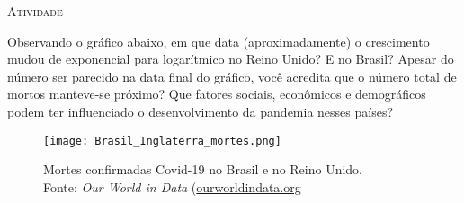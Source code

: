 \documentclass[10 pt,usenames,dvipsnames, oneside]{article}
\begin{document}
\bigskip
\begin{center}
{\large \scshape Atividade}
\end{center}
\fi

Observando o gráfico abaixo, em que data (aproximadamente) o crescimento mudou de exponencial para logarítmico no Reino Unido? E no Brasil? Apesar do número ser parecido na data final do gráfico, você acredita que o número total de mortos manteve-se próximo? Que fatores sociais, econômicos e demográficos podem ter influenciado o desenvolvimento da pandemia nesses países? 

\begin{figure}[H]
\centering
\texttt{[image: Brasil\_Inglaterra\_mortes.png]}

\caption{Mortes confirmadas Covid-19 no Brasil e no Reino Unido. \\ Fonte: \textit{Our World in Data} (\url{ourworldindata.org}}
\end{figure}

\ifdefined\prof


\fi
\end{document}
